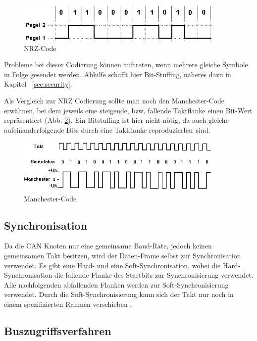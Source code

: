 \begin{figure}[h] 
\centering
\includegraphics[width=0.9\textwidth]{figures/nrzcode}
\caption{NRZ-Code \citep{NRZ}} 
\label{nrzcode}
\end{figure} 

Probleme bei dieser Codierung können auftreten, wenn mehrere gleiche Symbole in Folge
gesendet werden. Abhilfe schafft hier Bit-Stuffing, näheres dazu in Kapitel ~\ref{sec:security}.

Als Vergleich zur NRZ Codierung sollte man noch den Manchester-Code erwähnen, bei dem
jeweils eine steigende, bzw. fallende Taktflanke einen Bit-Wert repräsentiert (Abb. \ref{mancode}).
Ein Bitstuffing ist hier nicht nötig, da auch gleiche aufeinanderfolgende Bits durch eine Taktflanke 
reproduzierbar sind.

\begin{figure}[h] 
\centering
\includegraphics[width=0.9\textwidth]{figures/mancode}
\caption{Manchester-Code \citep{MAN}} 
\label{mancode}
\end{figure} 
	
\subsection{Synchronisation}

Da die CAN Knoten nur eine gemeinsame Baud-Rate, jedoch keinen gemeinsamen Takt besitzen, 
wird der Daten-Frame selbst zur Synchronisation verwendet. Es gibt eine Hard- und eine Soft-Synchronisation,
wobei die Hard-Synchronisation die fallende Flanke des Startbits zur Synchronisierung verwendet. Alle 
nachfolgenden abfallenden Flanken werden zur Soft-Synchronisierung verwendet. Durch die Soft-Synchronisierung
kann sich der Takt nur noch in einem spezifizierten Rahmen verschieben \citep[nach][]{BSY}.
	
\subsection{Buszugriffsverfahren}
\label{sec:access}

